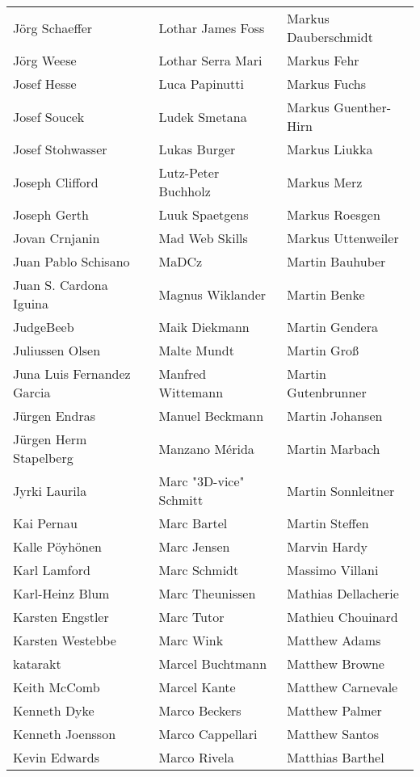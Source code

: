 \begin{small}
\begin{tabular}{p{4cm}p{4cm}p{4cm}}
Jörg Schaeffer & Lothar James Foss & Markus Dauberschmidt \\
Jörg Weese & Lothar Serra Mari & Markus Fehr \\
Josef Hesse & Luca Papinutti & Markus Fuchs \\
Josef Soucek & Ludek Smetana & Markus Guenther-Hirn \\
Josef Stohwasser & Lukas Burger & Markus Liukka \\
Joseph Clifford & Lutz-Peter Buchholz & Markus Merz \\
Joseph Gerth & Luuk Spaetgens & Markus Roesgen \\
Jovan Crnjanin & Mad Web Skills & Markus Uttenweiler \\
Juan Pablo Schisano & MaDCz & Martin Bauhuber \\
Juan S. Cardona Iguina & Magnus Wiklander & Martin Benke \\
JudgeBeeb & Maik Diekmann & Martin Gendera \\
Juliussen Olsen & Malte Mundt & Martin Groß \\
Juna Luis Fernandez Garcia & Manfred Wittemann & Martin Gutenbrunner \\
Jürgen Endras & Manuel Beckmann & Martin Johansen \\
Jürgen Herm Stapelberg & Manzano Mérida & Martin Marbach \\
Jyrki Laurila & Marc "3D-vice" Schmitt & Martin Sonnleitner \\
Kai Pernau & Marc Bartel & Martin Steffen \\
Kalle Pöyhönen & Marc Jensen & Marvin Hardy \\
Karl Lamford & Marc Schmidt & Massimo Villani \\
Karl-Heinz Blum & Marc Theunissen & Mathias Dellacherie \\
Karsten Engstler & Marc Tutor & Mathieu Chouinard \\
Karsten Westebbe & Marc Wink & Matthew Adams \\
katarakt & Marcel Buchtmann & Matthew Browne \\
Keith McComb & Marcel Kante & Matthew Carnevale \\
Kenneth Dyke & Marco Beckers & Matthew Palmer \\
Kenneth Joensson & Marco Cappellari & Matthew Santos \\
Kevin Edwards & Marco Rivela & Matthias Barthel \\
\end{tabular}
\newpage
\setlength{\tabcolsep}{1mm}

\end{small}
